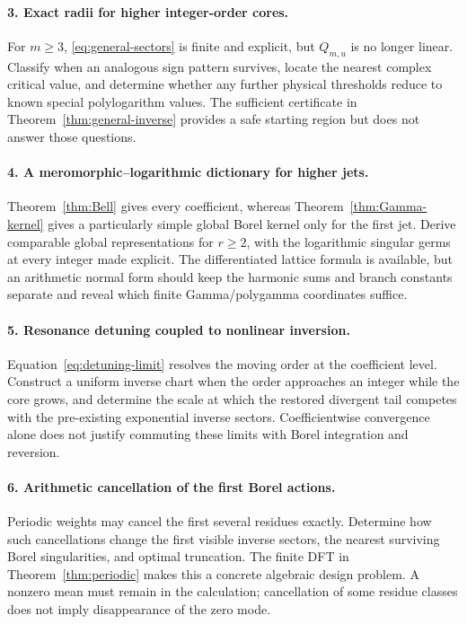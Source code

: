 \documentclass[11pt,a4paper]{article}
\theoremstyle{definition}\newtheorem{definition}[theorem]{Definition}
\theoremstyle{remark}\newtheorem{remark}[theorem]{Remark}
\numberwithin{equation}{section}
\begin{document}
\paragraph{3. Exact radii for higher integer-order cores.}
For $m\ge3$, \eqref{eq:general-sectors} is finite and explicit, but
$Q_{m,u}$ is no longer linear. Classify when an analogous sign pattern
survives, locate the nearest complex critical value, and determine whether
any further physical thresholds reduce to known special polylogarithm
values. The sufficient certificate in Theorem~\ref{thm:general-inverse}
provides a safe starting region but does not answer those questions.

\paragraph{4. A meromorphic--logarithmic dictionary for higher jets.}
Theorem~\ref{thm:Bell} gives every coefficient, whereas
Theorem~\ref{thm:Gamma-kernel} gives a particularly simple global Borel
kernel only for the first jet. Derive comparable global representations
for $r\ge2$, with the logarithmic singular germs at every integer made
explicit. The differentiated lattice formula is available, but an
arithmetic normal form should keep the harmonic sums and branch constants
separate and reveal which finite Gamma/polygamma coordinates suffice.

\paragraph{5. Resonance detuning coupled to nonlinear inversion.}
Equation~\eqref{eq:detuning-limit} resolves the moving order at the
coefficient level. Construct a uniform inverse chart when the order
approaches an integer while the core grows, and determine the scale at
which the restored divergent tail competes with the pre-existing
exponential inverse sectors. Coefficientwise convergence alone does not
justify commuting these limits with Borel integration and reversion.

\paragraph{6. Arithmetic cancellation of the first Borel actions.}
Periodic weights may cancel the first several residues exactly. Determine
how such cancellations change the first visible inverse sectors, the
nearest surviving Borel singularities, and optimal truncation. The finite
DFT in Theorem~\ref{thm:periodic} makes this a concrete algebraic design
problem. A nonzero mean must remain in the calculation; cancellation of
some residue classes does not imply disappearance of the zero mode.
\end{document}
